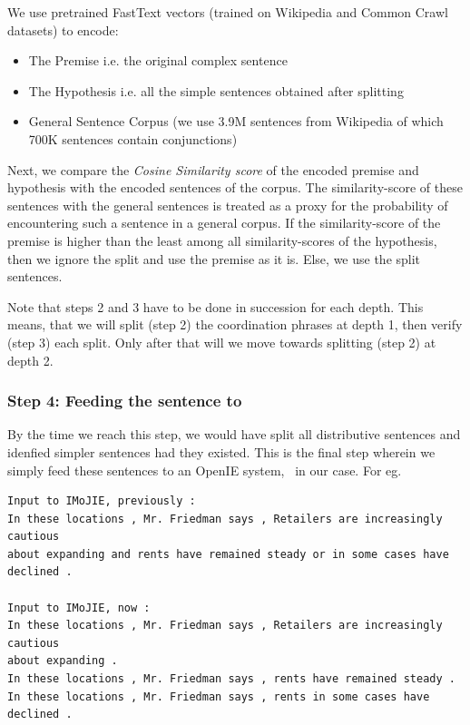             We use pretrained FastText vectors (trained on Wikipedia and Common Crawl datasets) to encode:
            \begin{itemize}
                \item The Premise i.e. the original complex sentence
                \item The Hypothesis i.e. all the simple sentences obtained after splitting
                \item General Sentence Corpus (we use 3.9M sentences from Wikipedia of which 700K sentences contain conjunctions)
            \end{itemize}

            Next, we compare the \emph{Cosine Similarity score} of the encoded premise and hypothesis with the encoded sentences of the corpus. The similarity-score of these sentences with the general sentences is treated as a proxy for the probability of encountering such a sentence in a general corpus. If the similarity-score of the premise is higher than the least among all similarity-scores of the hypothesis, then we ignore the split and use the premise as it is. Else, we use the split sentences.

            Note that steps 2 and 3 have to be done in succession for each depth. This means, that we will split (step 2) the coordination phrases at depth 1, then verify (step 3) each split. Only after that will we move towards splitting (step 2) at depth 2.

        \subsubsection{Step 4: Feeding the sentence to \shortname}

            By the time we reach this step, we would have split all distributive sentences and idenfied simpler sentences had they existed. This is the final step wherein we simply feed these sentences to an OpenIE system, \shortname\ in our case. For eg.

            \begin{verbatim}
Input to IMoJIE, previously :
In these locations , Mr. Friedman says , Retailers are increasingly cautious
about expanding and rents have remained steady or in some cases have declined .

Input to IMoJIE, now :
In these locations , Mr. Friedman says , Retailers are increasingly cautious
about expanding .
In these locations , Mr. Friedman says , rents have remained steady .
In these locations , Mr. Friedman says , rents in some cases have declined .
            \end{verbatim}

